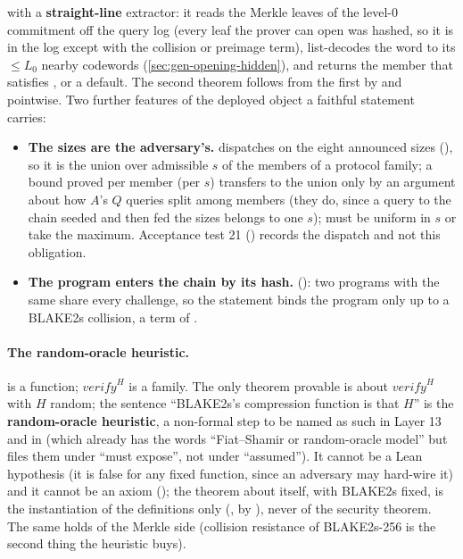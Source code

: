 with  a \textbf{straight-line} extractor: it reads the Merkle leaves of the level-0
commitment off the query log (every leaf the prover can open was hashed, so it is in the log except
with the collision or preimage term), list-decodes the word to its $≤ L_0$ nearby codewords
(\cref{sec:gen-opening-hidden}), and returns the member that satisfies , or a default.
The second theorem follows from the first by  and
 pointwise. Two further features of the deployed object a faithful
statement carries:
\begin{itemize}
\item \textbf{The sizes are the adversary's.}  dispatches on the eight announced sizes
  (), so it is the union over admissible $s$ of the members of a protocol
  family; a bound proved per member (per $s$) transfers to the union only by an argument about how
  $A$'s $Q$ queries split among members (they do, since a query to the chain seeded and then fed the
  sizes belongs to one $s$);  must be uniform in $s$ or take the maximum. Acceptance
  test 21 () records the dispatch and not this obligation.
\item \textbf{The program enters the chain by its hash.}
   (): two
  programs with the same  share every challenge, so the statement binds the
  program only up to a BLAKE2s collision, a term of .
\end{itemize}

\paragraph{The random-oracle heuristic.}  is a function; $\mathit{verify}^H$ is a
family. The only theorem provable is about $\mathit{verify}^H$ with $H$ random; the sentence
``BLAKE2s's compression function is that $H$'' is the \textbf{random-oracle heuristic}, a
non-formal step to be named as such in Layer 13 and in  (which already has
the words ``Fiat--Shamir or random-oracle model'' but files them under ``must expose'', not under
``assumed''). It cannot be a Lean hypothesis (it is false for any fixed function, since an
adversary may hard-wire it) and it cannot be an axiom (); the theorem about
 itself, with BLAKE2s fixed, is the instantiation  of the
definitions only (, by ), never of the security
theorem. The same holds of the Merkle side (collision resistance of BLAKE2s-256 is the second thing
the heuristic buys).

